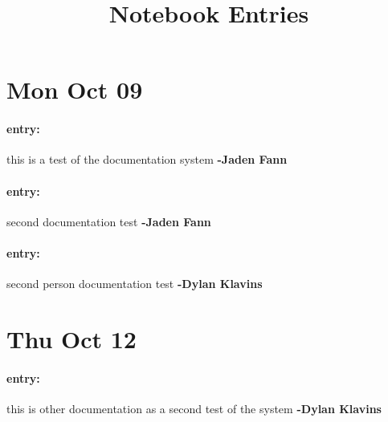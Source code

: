 \documentclass{article}
\title{Notebook Entries}
\begin{document}
\maketitle

\section{Mon Oct 09}
\paragraph{entry:} 	this is a test
	of the documentation system \textbf{-Jaden Fann}
\paragraph{entry:} 	second documentation test \textbf{-Jaden Fann}
\paragraph{entry:} 	second person documentation test \textbf{-Dylan Klavins}
\section{Thu Oct 12}
\paragraph{entry:} 	this is other documentation
	as a second test of the system \textbf{-Dylan Klavins}
\end{document}
